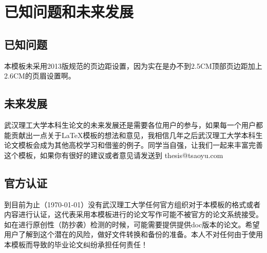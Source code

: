 \section{已知问题和未来发展}
\subsection{已知问题}
本模板未采用2013版规范的页边距设置，因为实在是办不到2.5CM顶部页边距加上2.6CM的页眉设置啊。
\subsection{未来发展}
武汉理工大学本科生论文的未来发展还是需要各位用户的参与，如果每一个用户都能贡献出一点关于\LaTeX 模板的想法和意见，我相信几年之后武汉理工大学本科生论文模板会成为其他高校学习和借鉴的例子。同学当自强，让我们一起来丰富完善这个模板，如果你有很好的建议或者意见请发送到 thesis@tsaoyu.com
\subsection{官方认证}
到目前为止（\today ）没有武汉理工大学任何官方组织对于本模板的格式或者内容进行认证，这代表采用本模板进行的论文写作可能不被官方的论文系统接受。如在进行原创性（防抄袭）检测的时候，可能需要提供提供doc版本的论文。希望用户了解到这个潜在的风险，做好文件转换和备份的准备。本人不对任何由于使用本模板而导致的毕业论文纠纷承担任何责任！